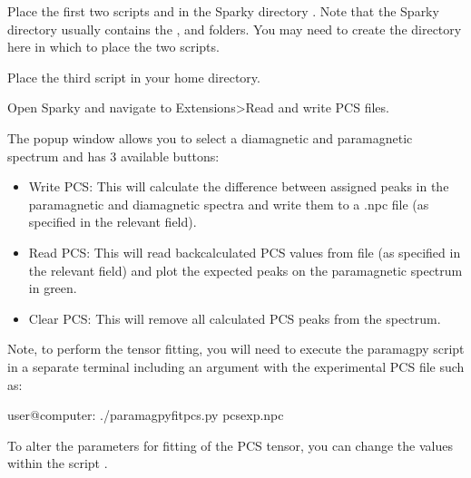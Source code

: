 \documentclass[a4paper,10pt,english,openany,oneside]{sphinxmanual}
\begin{document}
\sphinxAtStartPar
Place the first two scripts  and  in the Sparky directory . Note that the Sparky directory usually contains the ,  and  folders. You may need to create the  directory here in which to place the two scripts.

\sphinxAtStartPar
Place the third script  in your home directory.

\sphinxAtStartPar
Open Sparky and navigate to Extensions\sphinxhyphen{}\textgreater{}Read and write PCS files.

\noindent{}

\sphinxAtStartPar
The popup window allows you to select a diamagnetic and paramagnetic spectrum and has 3 available buttons:
\begin{itemize}
\item {} 
\sphinxAtStartPar
Write PCS: This will calculate the difference between assigned peaks in the paramagnetic and diamagnetic spectra and write them to a .npc file (as specified in the relevant field).

\item {} 
\sphinxAtStartPar
Read PCS: This will read back\sphinxhyphen{}calculated PCS values from file (as specified in the relevant field) and plot the expected peaks on the paramagnetic spectrum in green.

\item {} 
\sphinxAtStartPar
Clear PCS: This will remove all calculated PCS peaks from the spectrum.

\end{itemize}

\sphinxAtStartPar
Note, to perform the tensor fitting, you will need to execute the paramagpy script in a separate terminal including an argument with the experimental PCS file such as:

\begin{sphinxVerbatim}[commandchars=\\\{\}]
user@computer:\PYGZti{}\PYGZdl{} ./paramagpy\PYGZus{}fit\PYGZus{}pcs.py pcsexp.npc
\end{sphinxVerbatim}

\sphinxAtStartPar
To alter the parameters for fitting of the PCS tensor, you can change the values within the script .
\end{document}
